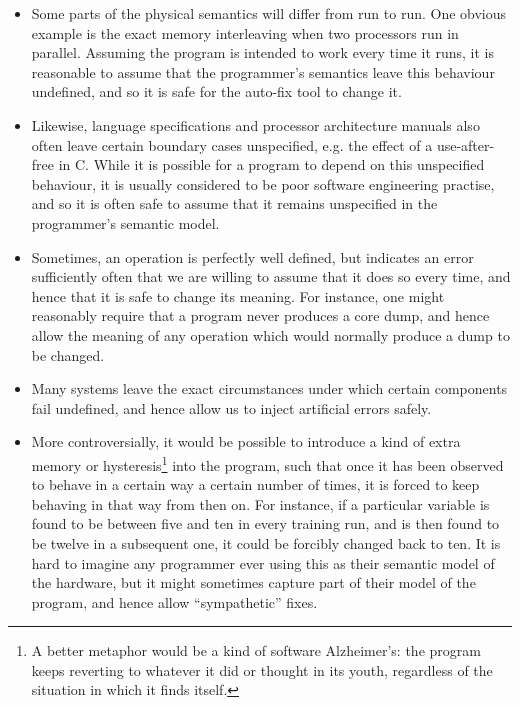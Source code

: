 \begin{itemize}
\item Some parts of the physical semantics will differ from run to
  run.  One obvious example is the exact memory interleaving when two
  processors run in parallel.  Assuming the program is intended to
  work every time it runs, it is reasonable to assume that the
  programmer's semantics leave this behaviour undefined, and so
  it is safe for the auto-fix tool to change it.

\item Likewise, language specifications and processor architecture
  manuals also often leave certain boundary cases unspecified,
  e.g. the effect of a use-after-free in C\cite{Kernighan1988}.  While
  it is possible for a program to depend on this unspecified
  behaviour, it is usually considered to be poor software engineering
  practise\cite{CWE758}, and so it is often safe to assume that it
  remains unspecified in the programmer's semantic model.

\item Sometimes, an operation is perfectly well defined, but indicates
  an error sufficiently often that we are willing to assume that it
  does so every time, and hence that it is safe to change its meaning.
  For instance, one might reasonably require that a program never
  produces a core dump, and hence allow the meaning of any operation
  which would normally produce a dump to be changed.

\item Many systems leave the exact circumstances under which certain
  components fail undefined, and hence allow us to inject artificial
  errors safely.

\item More controversially, it would be possible to introduce a kind
  of extra memory or hysteresis\footnote{A better metaphor would be a
    kind of software Alzheimer's: the program keeps reverting to
    whatever it did or thought in its youth, regardless of the
    situation in which it finds itself.} into the program, such that once it has been
  observed to behave in a certain way a certain number of times, it is
  forced to keep behaving in that way from then on.  For instance, if
  a particular variable is found to be between five and ten in every
  training run, and is then found to be twelve in a subsequent one, it
  could be forcibly changed back to ten.  It is hard to imagine any
  programmer ever using this as their semantic model of the hardware,
  but it might sometimes capture part of their model of the program,
  and hence allow ``sympathetic'' fixes.

\end{itemize}

